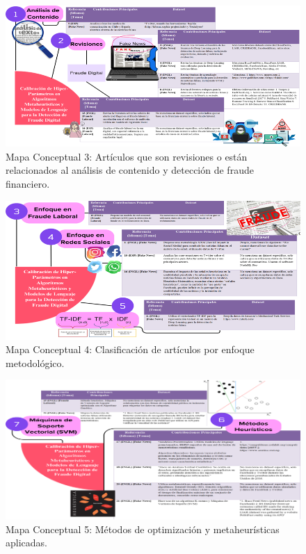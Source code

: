 \begin{figure}[h!]
    \centering
    \includegraphics[width=\textwidth]{Imagenes/mapaConceptual3.png}
    \caption{Mapa Conceptual 3: Artículos que son revisiones o están relacionados al análisis de contenido y detección de fraude financiero.}
    \label{fig:mapa_conceptual_3}
\end{figure}

\begin{figure}[h!]
    \centering
    \includegraphics[width=\textwidth]{Imagenes/mapaConceptual4.png}
    \caption{Mapa Conceptual 4: Clasificación de artículos por enfoque metodológico.}
    \label{fig:mapa_conceptual_4}
\end{figure}

\begin{figure}[h!]
    \centering
    \includegraphics[width=\textwidth]{Imagenes/mapaConceptual5.png}
    \caption{Mapa Conceptual 5: Métodos de optimización y metaheurísticas aplicadas.}
    \label{fig:mapa_conceptual_5}
\end{figure}

